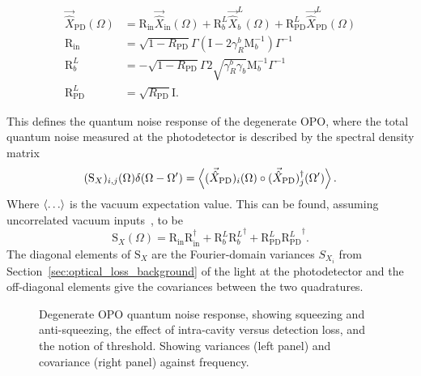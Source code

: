 \begin{align}
\label{eq:dOPO_PD_as_fn_of_vac}
\vec{\hat X}_\mathrm{PD}(\Omega)&=\text{R}_\text{in}\vec{\hat X}_\mathrm{in}(\Omega)+\text{R}^L_b\vec{\hat X}^L_b(\Omega)+\text{R}^L_\text{PD}\vec{\hat X}^L_\text{PD}(\Omega)\\
\text{R}_\text{in}&=\sqrt{1-R_\text{PD}}\Gamma\left(\text{I}-2\gamma^b_R\text{M}_b^{-1}\right)\Gamma^{-1}\\
\text{R}^L_b&=-\sqrt{1-R_\text{PD}}\Gamma 2\sqrt{\gamma^b_R \gamma_b}\text{M}_b^{-1}\Gamma^{-1}\\
\text{R}^L_\text{PD}&=\sqrt{R_\text{PD}} \text{I}.
\end{align}

This defines the quantum noise response of the degenerate OPO, where the total quantum noise measured at the photodetector is described by the spectral density matrix 
\begin{equation}\label{eq:total_noise_matrix}
(\text{S}_X)_{i,j}(\Omega)\delta(\Omega-\Omega')=\ev{(\vec{\hat X}_\text{PD})_i(\Omega)\circ(\vec{\hat X}_\text{PD})_j^\dag(\Omega')}.
\end{equation}
Where $\ev{\ldots}$ is the vacuum expectation value. This can be found, assuming uncorrelated vacuum inputs~\cite{}, to be
\begin{equation}\label{eq:dOPO_Sx_abstract}
\text{S}_X(\Omega)=\text{R}_\text{in} \text{R}_\text{in}^\dag+\text{R}^L_b {\text{R}^L_b}^\dag+\text{R}^L_\text{PD}{\text{R}^L_\text{PD}}^\dag.
\end{equation}
The diagonal elements of $\text{S}_X$ are the Fourier-domain variances $S_{X_i}$ from Section~\ref{sec:optical_loss_background} of the light at the photodetector and the off-diagonal elements give the covariances between the two quadratures.


\begin{figure}
	\centering
	\caption{ Degenerate OPO quantum noise response, showing squeezing and anti-squeezing, the effect of intra-cavity versus detection loss, and the notion of threshold. Showing variances (left panel) and covariance (right panel) against frequency.}
	\label{fig:dOPO_variances}
\end{figure}

